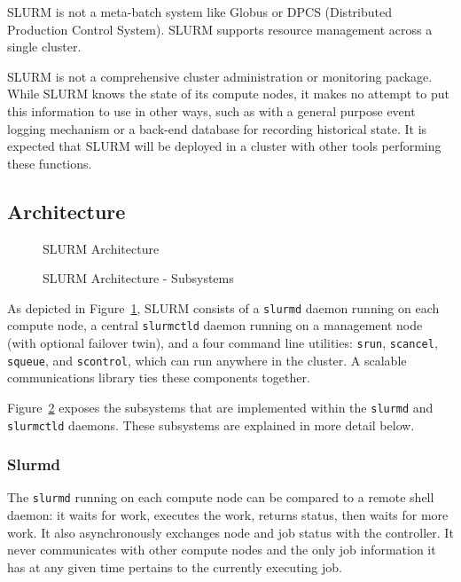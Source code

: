 SLURM is not a meta-batch system like Globus or DPCS (Distributed Production 
Control System).  SLURM supports resource management across a single cluster.

SLURM is not a comprehensive cluster administration or monitoring package.  
While SLURM knows the state of its compute nodes, it makes no attempt to put
this information to use in other ways, such as with a general purpose event
logging mechanism or a back-end database for recording historical state.
It is expected that SLURM will be deployed in a cluster with other 
tools performing these functions. 

\subsection{Architecture}

\begin{figure}[htb]
\centerline{}
\caption{SLURM Architecture}
\label{arch}
\end{figure}

\begin{figure}[htb]
\centerline{}
\caption{SLURM Architecture - Subsystems}
\label{archdetail}
\end{figure}


As depicted in Figure~\ref{arch}, SLURM consists of 
a {\tt slurmd} daemon running on each compute node, 
a central {\tt slurmctld} daemon running on a management node (with optional 
failover twin), 
and a four command line utilities: {\tt srun}, {\tt scancel}, {\tt squeue}, 
and {\tt scontrol}, which can run anywhere in the cluster.
A scalable communications library ties these components together.

Figure~\ref{archdetail} exposes the subsystems that are implemented within
the {\tt slurmd} and {\tt slurmctld} daemons.  These subsystems are explained
in more detail below.

\subsubsection{Slurmd}

The {\tt slurmd} running
on each compute node can be compared to a remote shell daemon:  it waits 
for work, executes the work, returns status, then waits for more work.  
It also asynchronously exchanges node and job status with the controller.  
It never communicates with other compute nodes and the only job information 
it has at any given time pertains to the currently executing job.

